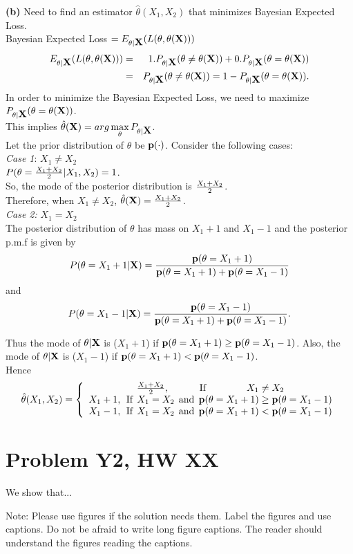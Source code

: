 \documentclass[12pt]{article}
\def\frac#1#2{{{#1}\over{#2}}}
\def\p   {\hbox{\bf p}}
\def\X   {\hbox{\bf X}}
\begin{document}
\textbf{(b)} Need to find an estimator $\hat{\theta}(X_1,X_2)$ that minimizes Bayesian Expected Loss. \\

Bayesian Expected Loss $=E_{\theta|\X}(L(\theta,\theta(\X)))$
\begin{eqnarray}
E_{\theta|\X}(L(\theta,\theta(\X))) &=& 1. P_{\theta|\X}(\theta\neq \theta(\X))+0. P_{\theta|\X}(\theta=\theta(\X))\\
&=& P_{\theta|\X}(\theta\neq \theta(\X))=1-P_{\theta|\X}(\theta=\theta(\X)).
\end{eqnarray}
In order to minimize the Bayesian Expected Loss, we need to maximize \\
$P_{\theta|\X}(\theta=\theta(\X))$. \\
This implies
$\hat{\theta}(\X)=arg\max\limits_{\theta} P_{\theta|\X}$. \\

Let the prior distribution of $\theta$ be $\p(\cdot)$. 
Consider the following cases:\\

\emph{Case 1}: $X_1\neq X_2$ \\

$P(\theta=\frac{X_1+X_2}{2}|X_1,X_2)=1$. \\So, the mode of the posterior distribution is $\frac{X_1+X_2}{2}$. \\Therefore, when $X_1\neq X_2$, $\hat{\theta}(\X)=\frac{X_1+X_2}{2}$. \\

\emph{Case 2:} $X_1=X_2$\\

The posterior distribution of $\theta$ has mass on $X_1+1$ and $X_1-1$ and the posterior p.m.f is given by
\begin{equation}
P(\theta=X_1+1|\X)=\frac{\p(\theta=X_1+1)}{\p(\theta=X_1+1)+\p(\theta=X_1-1)}
\end{equation}
and 
\begin{equation}
P(\theta=X_1-1|\X)=\frac{\p(\theta=X_1-1)}{\p(\theta=X_1+1)+\p(\theta=X_1-1)}.
\end{equation}


Thus the mode of $\theta|\X$ is ($X_1+1$) if $\p(\theta=X_1+1)\geq \p(\theta=X_1-1)$. Also, the mode of $\theta|\X$ is ($X_1-1$) if $\p(\theta=X_1+1) < \p(\theta=X_1-1)$. \\
Hence
$$
\hat{\theta}(X_1,X_2)=\left\{\begin{array}{c}
\frac{X_1+X_2}{2}, \:\:\:\:\:\:\:\:\:\:\:\:\:\:\mbox{If}\:\:\:\:\:\:\:\:\:\:\:\:\:\:\:\:\:\:\:X_1\neq X_2\\
X_1+1,\:\:\mbox{If}\:\:X_1=X_2\:\:\mbox{and}\:\:\p(\theta=X_1+1)\geq \p(\theta=X_1-1)\\
X_1-1,\:\:\mbox{If}\:\:X_1=X_2\:\:\mbox{and}\:\:\p(\theta=X_1+1)<\p(\theta=X_1-1)\\
\end{array}
\right.
$$
\section*{Problem Y2, HW XX} We show that...

\vspace{2cm}
Note: Please use figures if the solution needs them. Label the figures and use
captions. Do not be afraid to write long figure captions. The reader
should understand the figures reading the captions.
\end{document}
